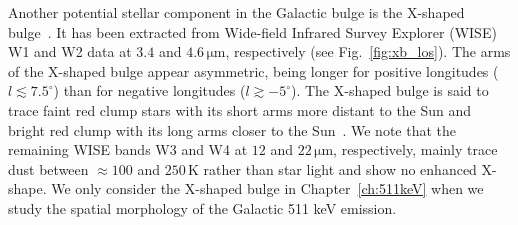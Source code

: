 \documentclass[doublespace,nopageskip]{VTthesis}
\newcommand{\mrm}[1]{\mathrm{#1}}
\begin{document}
Another potential stellar component in the Galactic bulge is the X-shaped bulge~\citep{2016AJ....152...14N}.
%
It has been extracted from Wide-field Infrared Survey Explorer (WISE) W1 and W2 data at $3.4$ and $4.6\,\mrm{\mu m}$, respectively (see Fig.~\ref{fig:xb_los}).
%
%
The arms of the X-shaped bulge appear asymmetric, being longer for positive longitudes ($l \lesssim 7.5^{\circ}$) than for negative longitudes ($l \gtrsim -5^{\circ}$).
%
The X-shaped bulge is said to trace faint red clump stars with its short arms more distant to the Sun and bright red clump with its long arms closer to the Sun~\cite{2018ApJ...862L...8L}.
%
We note that the remaining WISE bands W3 and W4 at $12$ and $22\,\mrm{\mu m}$, respectively, mainly trace dust between $\approx 100$ and $250\,\mrm{K}$ rather than star light and show no enhanced X-shape.
%
We only consider the X-shaped bulge in Chapter~\ref{ch:511keV} when we study the spatial morphology of the Galactic 511 keV emission.
\end{document}

